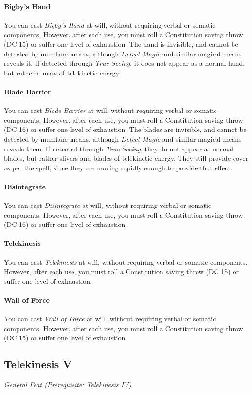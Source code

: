 \documentclass[twocolumn]{dndbook}
\begin{document}
\paragraph*{Bigby's Hand} You can cast \emph{Bigby's Hand} at will,
without requiring verbal or somatic components. However, after each use, you must roll a Constitution saving throw (DC 15) or suffer one level of exhaustion.
The hand is invisible, and cannot be detected by mundane means,
although \emph{Detect Magic} and similar magical means reveals it.
If detected through \emph{True Seeing}, it does not appear as a normal hand, but rather a mass of telekinetic energy.
\paragraph*{Blade Barrier} You can cast \emph{Blade Barrier} at will,
without requiring verbal or somatic components. However, after each use, you must roll a Constitution saving throw (DC 16) or suffer one level of exhaustion.
The blades are invisible, and cannot be detected by mundane means,
although \emph{Detect Magic} and similar magical means reveals them.
If detected through \emph{True Seeing}, they do not appear as normal blades, but rather slivers and blades of telekinetic energy.
They still provide cover as per the spell, since they are moving rapidly enough to provide that effect.
\paragraph*{Disintegrate} You can cast \emph{Disintegrate} at will,
without requiring verbal or somatic components. However, after each use, you must roll a Constitution saving throw (DC 16) or suffer one level of exhaustion.
\paragraph*{Telekinesis} You can cast \emph{Telekinesis} at will,
without requiring verbal or somatic components. However, after each use, you must roll a Constitution saving throw (DC 15) or suffer one level of exhaustion.
\paragraph*{Wall of Force} You can cast \emph{Wall of Force} at will,
without requiring verbal or somatic components. However, after each use, you must roll a Constitution saving throw (DC 15) or suffer one level of exhaustion.

\subsection{Telekinesis V}
{\emph{General Feat (Prerequisite: Telekinesis IV)}}\par
\end{document}
